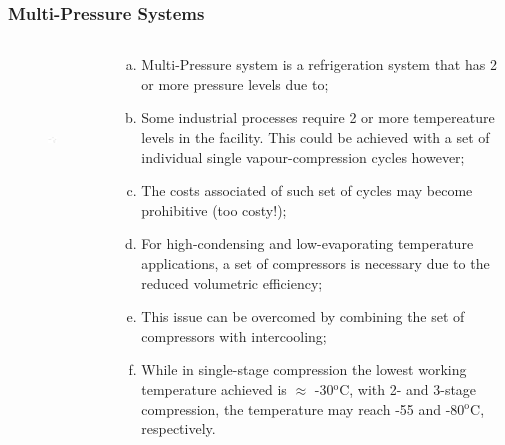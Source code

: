 \documentclass[10pt,compress]{beamer}
\begin{document}
\begin{frame}
 \frametitle{Multi-Pressure Systems}
 \begin{columns}
  \begin{column}[c]{0.33\linewidth}
   \begin{figure}%
      \includegraphics[width=4.5cm,height=4.5cm,clip]{./Pics/Overview_Refrig28}
   \end{figure}  
  \end{column}  
  \begin{column}[c]{0.67\linewidth}
   \begin{enumerate}[(a)]
    \item <1-> Multi-Pressure system is a refrigeration system that has 2 or more pressure levels due to;
    \item <2-> Some industrial processes require 2 or more tempereature levels in the facility. This could be achieved with a set of individual single vapour-compression cycles however;
    \item <3-> The costs associated of such set of cycles may become prohibitive (too costy!);
    \item <4-> For high-condensing and low-evaporating temperature applications, a set of compressors is necessary due to the reduced volumetric efficiency;
    \item <5-> This issue can be overcomed by combining the set of compressors with intercooling;
    \item <6-> While in single-stage compression the lowest working temperature achieved is $\approx$ -30$^{\text{o}}$C, with 2- and 3-stage compression, the temperature may reach -55 and -80$^{\text{o}}$C, respectively.
   \end{enumerate} 
  \end{column}  
 \end{columns} 
\end{frame}
\end{document}
